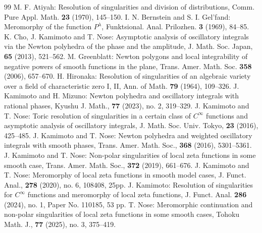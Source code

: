 \documentclass[10pt,a4paper]{amsart}
\numberwithin{equation}{section}
\newcommand{\1}{{\bf 1}}
\begin{document}
\begin{thebibliography}{99}
 M. F. Atiyah: Resolution of singularities and division of distributions, Comm. Pure Appl. Math. {\bf 23} (1970), 145--150.
 I. N. Bernstein and S. I. Gel'fand: Meromorphy of the function $P^{\lambda}$, Funktsional. Anal. Prilozhen. {\bf 3} (1969), 84--85.
 K. Cho, J. Kamimoto and T. Nose: Asymptotic analysis of oscillatory integrals via the Newton polyhedra of the phase and the amplitude, J. Math. Soc. Japan, {\bf 65} (2013), 521--562.
 M. Greenblatt: Newton polygons and local integrability of negative powers of smooth functions in the plane, Trans. Amer. Math. Soc. {\bf 358} (2006), 657--670.
 H. Hironaka: Resolution of singularities of an algebraic variety over a field of characteristic zero I, II, Ann. of Math. {\bf 79} (1964), 109--326.
 J. Kamimoto and H. Mizuno: Newton polyhedra and oscillatory integrals with rational phases, Kyushu J. Math., {\bf 77} (2023), no. 2, 319--329.
 J. Kamimoto and T. Nose: Toric resolution of singularities in a certain class of $C^{\infty}$ functions and asymptotic analysis of oscillatory integrals, J. Math. Soc. Univ. Tokyo, {\bf 23} (2016), 425--485.
 J. Kamimoto and T. Nose: Newton polyhedra and weighted oscillatory integrals with smooth phases, Trans. Amer. Math. Soc., {\bf 368} (2016), 5301--5361.
 J. Kamimoto and T. Nose: Non-polar singularities of local zeta functions in some smooth case, Trans. Amer. Math. Soc., {\bf 372} (2019), 661--676.
 J. Kamimoto and T. Nose: Meromorphy of local zeta functions in smooth model cases, J. Funct. Anal., {\bf 278} (2020), no. 6, 108408, 25pp.
 J. Kamimoto: Resolution of singularities for $C^{\infty}$ functions and meromorphy of local zeta functions, J. Funct. Anal. {\bf 286} (2024), no. 1, Paper No. 110185, 53 pp.
 T. Nose: Meromorphic continuation and non-polar singularities of local zeta functions in some smooth cases, Tohoku Math. J., {\bf 77} (2025), no. 3, 375--419.
\end{thebibliography}
\end{document}
